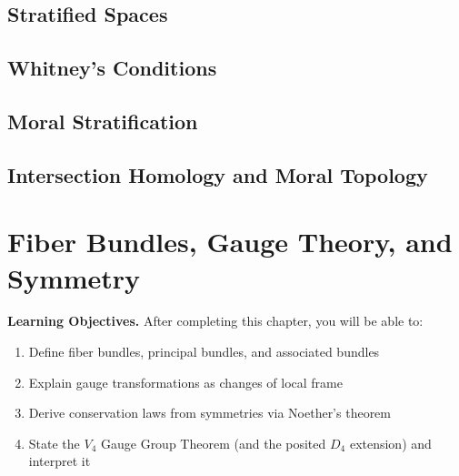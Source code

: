 \documentclass[12pt,letterpaper,twoside,openright]{book}
\theoremstyle{plain}
\theoremstyle{definition}
\theoremstyle{remark}
\begin{document}
\section{Stratified Spaces}

\section{Whitney's Conditions}

\section{Moral Stratification}

\section{Intersection Homology and Moral Topology}


\chapter{Fiber Bundles, Gauge Theory, and Symmetry}
\label{ch:gauge}

\begin{framed}
\noindent\textbf{Learning Objectives.} After completing this chapter, you will be able to:
\begin{enumerate}
    \item Define fiber bundles, principal bundles, and associated bundles
    \item Explain gauge transformations as changes of local frame
    \item Derive conservation laws from symmetries via Noether's theorem
    \item State the $V_4$ Gauge Group Theorem (and the posited $D_4$ extension) and interpret it
\end{enumerate}
\end{framed}
\end{document}

